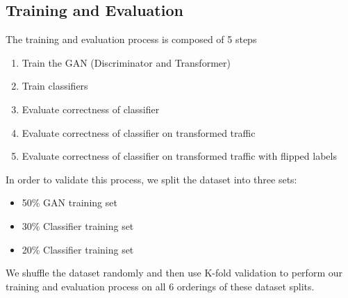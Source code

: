 \subsection{Training and Evaluation}
The training and evaluation process is composed of 5 steps
\begin{enumerate}
    \item Train the GAN (Discriminator and Transformer)
    \item Train classifiers
    \item Evaluate correctness of classifier
    \item Evaluate correctness of classifier on transformed traffic
    \item Evaluate correctness of classifier on transformed traffic with flipped labels
\end{enumerate}
In order to validate this process, we split the dataset into three sets:
\begin{itemize}
    \item 50\% GAN training set
    \item 30\% Classifier training set
    \item 20\% Classifier training set
\end{itemize}
We shuffle the dataset randomly and then use K-fold validation to perform our training and evaluation process on all 6 orderings of these dataset splits.


